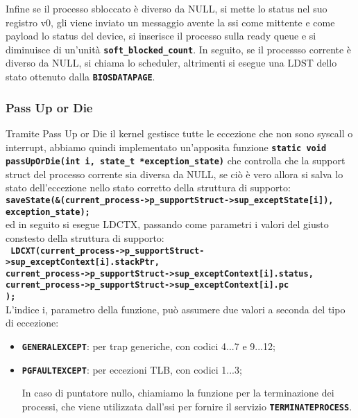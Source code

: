 \documentclass{article}
\begin{document}
Infine se il processo sbloccato è diverso da NULL, si mette lo status nel suo registro v0, gli viene inviato un messaggio 
avente la ssi come mittente e come payload lo status del device, si inserisce il processo sulla ready queue e si diminuisce di un'unità \texttt{\textbf{soft\_blocked\_count}}.
In seguito, se il processso corrente è diverso da NULL, si chiama lo scheduler, altrimenti si esegue una LDST dello stato 
ottenuto dalla \texttt{\textbf{BIOSDATAPAGE}}. 
\subsubsection{Pass Up or Die}
Tramite Pass Up or Die il kernel gestisce tutte le eccezione che non sono syscall o interrupt, abbiamo quindi implementato 
un'apposita funzione \texttt{\textbf{static void passUpOrDie(int i, state\_t *exception\_state)}} che controlla che la 
support struct del processo corrente sia diversa da NULL, se ciò è vero allora si salva lo stato dell'eccezione nello stato 
corretto della struttura di supporto: \\ 
\texttt{\textbf{saveState(\&(current\_process->p\_supportStruct->sup\_exceptState[i]), exception\_state);}}
\\ ed in seguito si esegue LDCTX, passando come parametri i valori del giusto constesto 
della struttura di supporto: \\ 
\texttt{\textbf{
      LDCXT(current\_process->p\_supportStruct->sup\_exceptContext[i].stackPtr, \\
            current\_process->p\_supportStruct->sup\_exceptContext[i].status, \\
            current\_process->p\_supportStruct->sup\_exceptContext[i].pc \\
      );
 }} \\
 L'indice i, parametro della funzione, può assumere due valori a seconda del tipo di eccezione:
 \begin{itemize}
    \item \texttt{\textbf{GENERALEXCEPT}}: per trap generiche, con codici 4...7 e 9...12;
    \item \texttt{\textbf{PGFAULTEXCEPT}}: per eccezioni TLB, con codici 1...3;

In caso di puntatore nullo, chiamiamo la funzione per la terminazione dei processi, che viene utilizzata dall'ssi per 
     fornire il servizio \texttt{\textbf{TERMINATEPROCESS}}.
\end{itemize}
\newpage
\end{document}
